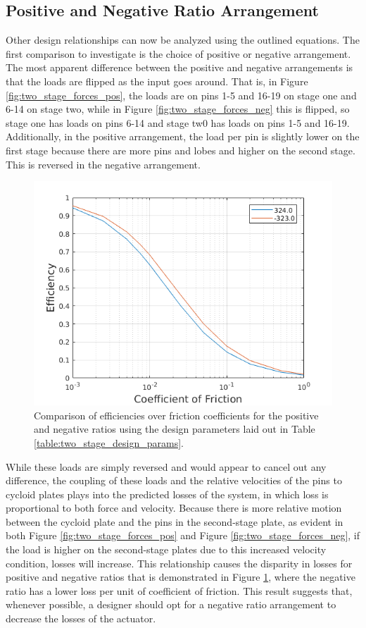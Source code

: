 \subsection{Positive and Negative Ratio Arrangement}\label{ch:dual:discussion:pos_neg}

Other design relationships can now be analyzed using the outlined equations. The first comparison to investigate is the choice of positive or negative arrangement. The most apparent difference between the positive and negative arrangements is that the loads are flipped as the input goes around. That is, in Figure \ref{fig:two_stage_forces_pos}, the loads are on pins 1-5 and 16-19 on stage one and 6-14 on stage two, while in Figure \ref{fig:two_stage_forces_neg} this is flipped, so stage one has loads on pins 6-14 and stage tw0 has loads on pins 1-5 and 16-19. Additionally, in the positive arrangement, the load per pin is slightly lower on the first stage because there are more pins and lobes and higher on the second stage. This is reversed in the negative arrangement. 

\begin{figure}[t]
	\centering
	\includegraphics[width=0.75\linewidth]{fig/two_stage_pos_neg}
   \caption{Comparison of efficiencies over friction coefficients for the positive and negative ratios using the design parameters laid out in Table \ref{table:two_stage_design_params}.}
   \label{fig:two_stage_pos_neg}
\end{figure}

While these loads are simply reversed and would appear to cancel out any difference, the coupling of these loads and the relative velocities of the pins to cycloid plates plays into the predicted losses of the system, in which loss is proportional to both force and velocity. Because there is more relative motion between the cycloid plate and the pins in the second-stage plate, as evident in both Figure \ref{fig:two_stage_forces_pos} and Figure \ref{fig:two_stage_forces_neg}, if the load is higher on the second-stage plates due to this increased velocity condition, losses will increase. This relationship causes the disparity in losses for positive and negative ratios that is demonstrated in Figure \ref{fig:two_stage_pos_neg}, where the negative ratio has a lower loss per  unit of coefficient of friction. This result suggests that, whenever possible, a designer should opt for a negative ratio arrangement to decrease the losses of the actuator. 



